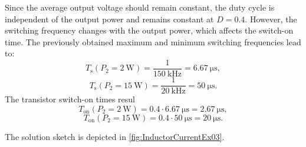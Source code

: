 \begin{solutionblock}
	Since the average output voltage should remain constant, the duty cycle is independent of the output power and remains constant at $D = 0.4$. However, the switching frequency changes with the output power, which affects the switch-on time.	The previously obtained maximum and minimum switching frequencies lead to:
	\begin{equation}
		T_\mathrm{s}(P_\mathrm{2}=\SI{2}{\watt}) = \frac{1}{\SI{150}{\kilo \hertz}}= \SI{6.67}{\micro \s},
	\end{equation}
	\begin{equation}
		T_\mathrm{s}(P_\mathrm{2}=\SI{15}{\watt}) = \frac{1}{\SI{20}{\kilo \hertz}}= \SI{50}{\micro \s}.
	\end{equation}
	The transistor switch-on times resul
	\begin{equation}
		T_\mathrm{on}(P_\mathrm{2}=\SI{2}{\watt}) = 0.4 \cdot \SI{6.67}{\micro \s} = \SI{2.67}{\micro \s},
	\end{equation}
	\begin{equation}
		T_\mathrm{on}(P_\mathrm{2}=\SI{15}{\watt}) = 0.4 \cdot \SI{50}{\micro \s}= \SI{20}{\micro \s}.
	\end{equation}
\end{solutionblock}

\begin{solutionblock}
	The solution sketch is depicted in \autoref{fig:InductorCurrentEx03}.
	
\end{solutionblock}


